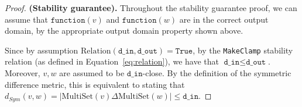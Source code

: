 \documentclass[11pt,a4paper]{article}
\newtheorem{lemma}{Lemma}
\theoremstyle{definition}
\newcommand{\MultiSet}{\mathrm{MultiSet}}
\newcommand{\din}{\texttt{d\_in}}
\newcommand{\dout}{\texttt{d\_out}}
\newcommand{\Relation}{\mathrm{Relation}}
\newcommand{\X}{\mathcal{X}}
\newcommand{\Y}{\mathcal{Y}}
\newcommand{\True}{\texttt{True}}
\newcommand{\False}{\texttt{False}}
\newcommand{\function}{\texttt{function}}
\newcommand{\silvia}[1]{{ {\color{blue}{(silvia)~#1}}}}
\newcommand{\grace}[1]{{ {\color{purple}{(grace)~#1}}}}
\begin{document}
\begin{proof}



        


\textbf{(Stability guarantee).} Throughout the stability guarantee proof, we can assume that $\function(v)$ and $\function(w)$ are in the correct output domain, by the appropriate output domain property shown above. 

Since by assumption $\Relation(\din, \dout) = \True$, by the \texttt{MakeClamp} stability relation (as defined in Equation~\eqref{eq:relation}), we have that $\din \leq \dout$. Moreover, $v, w$ are assumed to be $\din$-close. By the definition of the symmetric difference metric, this is equivalent to stating that $d_{Sym}(v, w) = |\MultiSet(v) \Delta \MultiSet(w)| \leq \din$.


\end{proof}
\end{document}
